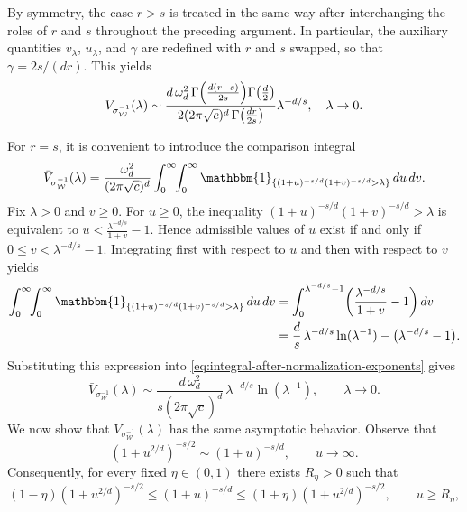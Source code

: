 \documentclass[a4paper,12pt]{article}
\let\originalleft\left
\let\originalright\right
\renewcommand{\left}{\mathopen{}\mathclose\bgroup\originalleft}
\renewcommand{\right}{\aftergroup\egroup\originalright}
\newcommand{\symbolnotsobw}{\symbolnot_{\mathcal{W}}}
\newcommand{\symbolnot}{\sigma}
\begin{document}
By symmetry, the case $r>s$ is treated in the same way after interchanging the
roles of $r$ and $s$ throughout the preceding argument. In particular, the
auxiliary quantities $v_\lambda$, $u_\lambda$, and $\gamma$ are redefined with
$r$ and $s$ swapped, so that $\gamma=2s/(dr)$. This yields
\begin{equation}\label{eq:final-asymp-vol-r-geq-s}
    V_{\symbolnotsobw^{-1}}(\lambda)
    \sim \frac{d \,\omega_d^2\,  \Gamma\left(\frac{d(r-s)}{2s}\right) \Gamma \left( \frac{d}{2} \right)}{2(2\pi\sqrt{c})^{d}\, \Gamma \left(\frac{dr}{2s}\right)}\lambda^{-d/s},
    \quad \lambda \to 0.
\end{equation}

\iffalse 
For $r=s$, it is convenient to introduce the comparison integral
\begin{equation}\label{eq:integral-after-normalization-exponents}
\bar V_{\symbolnotsobw^{-1}}(\lambda)
=
\frac{\omega_d^2}{(2\pi\sqrt{c})^{d}}
\int_0^\infty\!\!\int_0^\infty
\mathbbm{1}_{\{(1+u)^{-s/d}(1+v)^{-s/d}>\lambda\}}
\,du\,dv .
\end{equation}
Fix $\lambda>0$ and $v\ge0$. For $u\ge0$, the inequality $(1+u)^{-s/d}(1+v)^{-s/d}>\lambda$ 
is equivalent to $u<\frac{\lambda^{-d/s}}{1+v}-1$. Hence admissible values of $u$ exist if and only if $0\le v<\lambda^{-d/s}-1$.
Integrating first with respect to $u$ and then with respect to $v$ yields
\begin{align*}
\int_0^\infty\!\!\int_0^\infty
\mathbbm{1}_{\{(1+u)^{-s/d}(1+v)^{-s/d}>\lambda\}}
\,du\,dv
&=
\int_0^{\lambda^{-d/s}-1}
\left(\frac{\lambda^{-d/s}}{1+v}-1\right)\,dv \\
&=
\frac{d}{s}\,\lambda^{-d/s}\ln(\lambda^{-1})
-
\bigl(\lambda^{-d/s}-1\bigr).
\end{align*}
Substituting this expression into \eqref{eq:integral-after-normalization-exponents}
gives
\begin{equation}\label{eq:vbar-asymp1}
\bar V_{\symbolnotsobw^{-1}}(\lambda)
\sim
\frac{d\,\omega_d^2}{s(2\pi\sqrt{c})^{d}}
\,\lambda^{-d/s}\ln(\lambda^{-1}),
\qquad \lambda\to0 .
\end{equation}
We now show that $V_{\symbolnotsobw^{-1}}(\lambda)$ has the same
asymptotic behavior. Observe that
\[
(1+u^{2/d})^{-s/2}\sim(1+u)^{-s/d},
\qquad u\to\infty .
\]
Consequently, for every fixed $\eta \in (0,1)$ there exists $R_\eta>0$ such that
\begin{equation}\label{eq:r-eta-inequalities}
(1-\eta)(1+u^{2/d})^{-s/2}
\le
(1+u)^{-s/d}
\le
(1+\eta)(1+u^{2/d})^{-s/2},
\qquad u\ge R_\eta ,
\end{equation}
\end{document}
